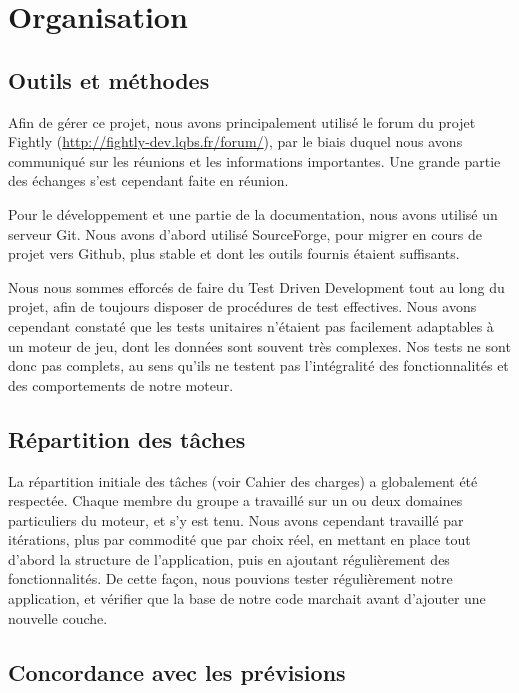 \documentclass[a4paper,10pt]{report}
\begin{document}
  \chapter{Organisation}

    \section{Outils et méthodes}

    Afin de gérer ce projet, nous avons principalement utilisé le forum du projet Fightly (\url{http://fightly-dev.lqbs.fr/forum/}), par le biais duquel nous avons communiqué sur les réunions et les informations importantes. Une grande partie des échanges s'est cependant faite en réunion. 

    Pour le développement et une partie de la documentation, nous avons utilisé un serveur Git. Nous avons d'abord utilisé SourceForge, pour migrer en cours de projet vers Github, plus stable et dont les outils fournis étaient suffisants. 

    Nous nous sommes efforcés de faire du Test Driven Development tout au long du projet, afin de toujours disposer de procédures de test effectives. Nous avons cependant constaté que les tests unitaires n'étaient pas facilement adaptables à un moteur de jeu, dont les données sont souvent très complexes. Nos tests ne sont donc pas complets, au sens qu'ils ne testent pas l'intégralité des fonctionnalités et des comportements de notre moteur. 

    \section{Répartition des tâches}

    La répartition initiale des tâches (voir Cahier des charges) a globalement été respectée. Chaque membre du groupe a travaillé sur un ou deux domaines particuliers du moteur, et s'y est tenu. Nous avons cependant travaillé par itérations, plus par commodité que par choix réel, en mettant en place tout d'abord la structure de l'application, puis en ajoutant régulièrement des fonctionnalités. De cette façon, nous pouvions tester régulièrement notre application, et vérifier que la base de notre code marchait avant d'ajouter une nouvelle couche. 

    \section{Concordance avec les prévisions}
\end{document}
